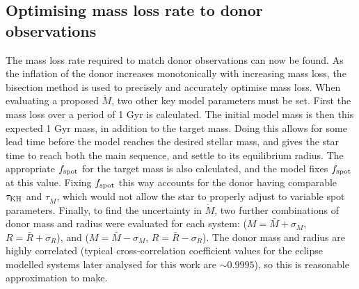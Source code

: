 \subsection{Optimising mass loss rate to donor observations}
\label{sect:modelling:optimising mass loss rate to observations}

The mass loss rate required to match donor observations can now be found. As the inflation of the donor increases monotonically with increasing mass loss, the bisection method is used to precisely and accurately optimise mass loss.
When evaluating a proposed $\dot M$, two other key model parameters must be set. First the mass loss over a period of 1 Gyr is calculated. The initial model mass is then this expected 1 Gyr mass, in addition to the target mass. Doing this allows for some lead time before the model reaches the desired stellar mass, and gives the star time to reach both the main sequence, and settle to its equilibrium radius.
The appropriate $f_{\rm spot}$ for the target mass is also calculated, and the model fixes $f_{\rm spot}$ at this value. Fixing $f_{\rm spot}$ this way accounts for the donor having comparable $\tau_{\rm KH}$ and $\tau_{\dot M}$, which would not allow the star to properly adjust to variable spot parameters.
Finally, to find the uncertainty in $\dot M$, two further combinations of donor mass and radius were evaluated for each system: ($M = \bar M + \sigma_M$, $R = \bar R + \sigma_R$), and ($M = \bar M - \sigma_M$, $R = \bar R - \sigma_R$). The donor mass and radius are highly correlated (typical cross-correlation coefficient values for the eclipse modelled systems later analysed for this work are $\sim 0.9995$), so this is reasonable approximation to make.



